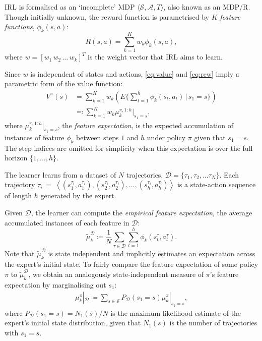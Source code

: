 \documentclass[letterpaper]{article}
\begin{document}
IRL is formalised as an `incomplete' MDP $\langle\mathcal{S},\mathcal{A},T\rangle$, also known as an MDP/R. Though initially unknown, the reward function is parametrised by $K$ \emph{feature functions}, $\phi_k(s,a)$:
\begin{equation}
R(s,a) = \sum_{k=1}^Kw_k\phi_k(s,a), \label{eq:rew}
\end{equation}
where $w=[w_1\,w_2\,\ldots\,w_k]^T$ is the weight vector that IRL aims to learn.

Since $w$ is independent of states and actions, \eqref{eq:value} and \eqref{eq:rew} imply a parametric form of the value function:
\begin{align}
 	V^{\pi}(s) &= \sum^K_{k=1}w_k\left(E\{\sum_{t = 1}^h\phi_k(s_t,a_t)\,\vert\, s_1 = s\}\right)\\
&\eqqcolon\sum^K_{k=1}w_k\mu^{\pi, 1:h}_k|_{s_1=s},\label{eq:parametrized_value}
\end{align}
where $\mu^{\pi,1:h}_k|_{s_1=s}$, the \emph{feature expectation}, is the expected accumulation of instances of feature $\phi_k$ between steps $1$ and $h$ under policy $\pi$  given that $s_1 = s$. The step indices are omitted for simplicity when this expectation is over the full horizon $\{1,\ldots,h\}$.

The learner learns from a dataset of $N$ trajectories, $\mathcal{D} = \big\{ \tau_1,\tau_2,...\tau_N \big\}$. Each trajectory $\tau_i~=~\left<(s^{\tau_i}_1,a^{\tau_i}_1),(s^{\tau_i}_2,a^{\tau_i}_2),\ldots,(s^{\tau_i}_{h},a^{\tau_i}_{h})\right>$ is a state-action sequence of length $h$ generated by the expert.

Given $\mathcal{D}$, the learner can compute the \emph{empirical feature expectation}, the average accumulated instances of each feature in $\mathcal{D}$:
\begin{equation}
	\widetilde{\mu}^{\mathcal{D}}_k \coloneqq\frac{1}{N}\sum_{\tau\in\mathcal{D}}\sum_{t=1}^{h}\phi_k(s^\tau_t,a^\tau_t). \label{eqn:empirical_fe}
\end{equation}
Note that $\widetilde{\mu}^{\mathcal{D}}_k$ is state independent and implicitly estimates an expectation across
the expert's initial state.  To fairly compare the feature expectation of some policy $\pi$ to $\widetilde{\mu}^{\mathcal{D}}_k$, we obtain an analogously state-independent measure of $\pi$'s feature expectation by marginalising out $s_1$:
\begin{align}
  \label{eq:feature_expectation_belief}
  \mu^{\pi}_k|_{\mathcal{D}} \coloneqq \sum_{s\in\mathcal{S}}P_{\mathcal{D}}(s_1 = s)\mu^{\pi}_k|_{s_1=s},
\end{align}
where $P_{\mathcal{D}}(s_1 = s)= N_1(s)/N$ is the maximum likelihood estimate of the expert's initial state distribution, given that $N_1(s)$ is the number of trajectories with $s_1 = s$.
\end{document}
